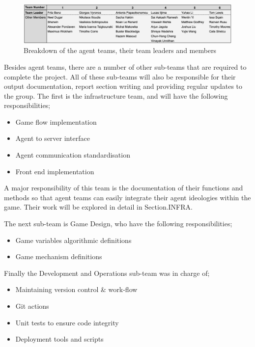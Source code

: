 \begin{figure}[htb]
    \centering
    \includegraphics[scale=0.55]{000_introduction/images/subteams.png}
    \caption{Breakdown of the agent teams, their team leaders and members}
    \label{fig:agentteams}
\end{figure}
    
Besides agent teams, there are a number of other sub-teams that are required to complete the project. All of these sub-teams will also be responsible for their output documentation, report section writing and providing regular updates to the group. 
The first is the infrastructure team, and will have the following responsibilities;

\begin{itemize}
    \item Game flow implementation
    \item Agent to server interface
    \item Agent communication standardisation
    \item Front end implementation
\end{itemize}

A major responsibility of this team is the documentation of their functions and methods so that agent teams can easily integrate their agent ideologies within the game. Their work will be explored in detail in Section.INFRA.

The next sub-team is Game Design, who have the following responsibilities;

\begin{itemize}
    \item Game variables algorithmic definitions
    \item Game mechanism definitions 
\end{itemize}

Finally the Development and Operations sub-team was in charge of;

\begin{itemize}
    \item Maintaining version control \& work-flow
    \item Git actions
    \item Unit tests to ensure code integrity
    \item Deployment tools and scripts
\end{itemize}

